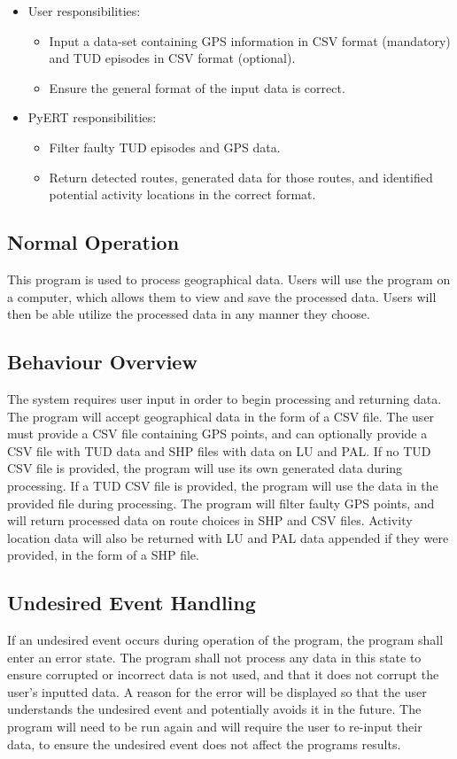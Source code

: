 \documentclass[12pt, titlepage]{article}
\begin{document}
\begin{itemize}
\item User responsibilities: 
    \begin{itemize}
        \item Input a data-set containing GPS information in CSV format (mandatory) and TUD episodes in CSV format (optional).
        \item Ensure the general format of the input data is correct.
    \end{itemize}
    
    \item PyERT responsibilities: 
        \begin{itemize}
        \item Filter faulty TUD episodes and GPS data.
        \item Return detected routes, generated data for those routes, and identified potential activity locations in the correct format.
        \end{itemize}
\end{itemize}

\subsection{Normal Operation}
This program is used to process geographical data. Users will use the program on a computer, which allows them to view and save the processed data. Users will then be able utilize the processed data in any manner they choose.
\subsection{Behaviour Overview}
The system requires user input in order to begin processing and returning data. The program will accept geographical data in the form of a CSV file. The user must provide a CSV file containing GPS points, and can optionally provide a CSV file with TUD data and SHP files with data on LU and PAL. If no TUD CSV file is provided, the program will use its own generated data during processing. If a TUD CSV file is provided, the program will use the data in the provided file during processing. The program will filter faulty GPS points, and will return processed data on route choices in SHP and CSV files. Activity location data will also be returned with LU and PAL data appended if they were provided, in the form of a SHP file.
\subsection{Undesired Event Handling}
If an undesired event occurs during operation of the program, the program shall enter an error state. The program shall not process any data in this state to ensure corrupted or incorrect data is not used, and that it does not corrupt the user's inputted data. A reason for the error will be displayed so that the user understands the undesired event and potentially avoids it in the future. The program will need to be run again and will require the user to re-input their data, to ensure the undesired event does not affect the programs results.
\end{document}
